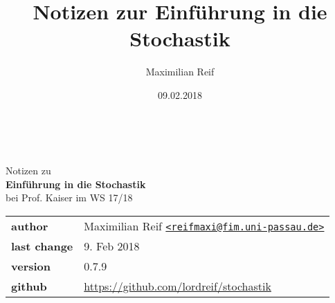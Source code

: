 \documentclass[11pt,a4paper,ngerman]{article}
\date{09.02.2018}
\author{Maximilian Reif}
\title{Notizen zur Einführung in die Stochastik}
\newcommand{\1}{\mathbbm{1}}
\begin{document}
\begin{titlepage}
    \ \newline\newline\newline\newline\newline
	
	\begin{center}

		\huge Notizen zu\\
		\Huge\textbf{Einführung in die Stochastik}\\
		\huge bei Prof. Kaiser im WS 17/18\\
		\normalsize

		\vspace{1cm}
		\begin{tabular}[b]{l|l}
			\textbf{author} 		& Maximilian Reif
			\texttt{\href{mailto:reifmaxi@fim.uni-passau.de}
			{<reifmaxi@fim.uni-passau.de>}}\\
			\textbf{last change}	& 9. Feb 2018 \\
			\textbf{version} 	& 0.7.9\\
			\textbf{github} 		& \url{https://github.com/lordreif/stochastik}
		\end{tabular}
		\vspace{1cm}
		
	\end{center}
	
	\begin{figure}[b]
	\centering
	\end{figure}
	
\end{titlepage}

%

\newpage
\tableofcontents\thispagestyle{empty}
\newpage

\setcounter{page}{1}





%

\end{document}
